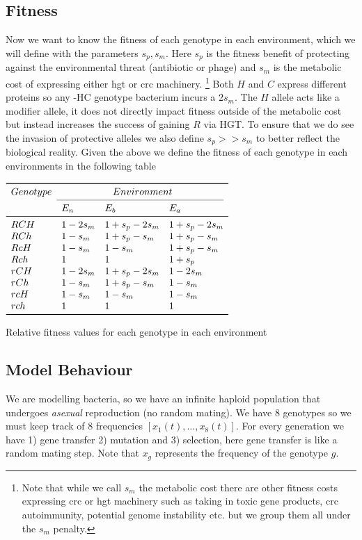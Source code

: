 \subsection{Fitness}
Now we want to know the fitness of each genotype in each environment, which we will define with the parameters $s_p,s_m$.
Here $s_p$ is the fitness benefit of protecting against the environmental threat (antibiotic or phage) and $s_m$ is the metabolic cost of expressing either \ac{hgt} or \ac{crc} machinery.
\footnote{Note that while we call $s_m$ the metabolic cost there are other fitness costs expressing \ac{crc} or \ac{hgt} machinery such as taking in toxic gene products, \ac{crc} autoimmunity, potential genome instability etc. but we group them all under the $s_m$ penalty.}
Both $H$ and $C$ express different proteins so any -HC genotype bacterium incurs a $2s_m$.
The $H$ allele acts like a modifier allele, it does not directly impact fitness outside of the metabolic cost but instead increases the success of gaining $R$ via HGT.
To ensure that we do see the invasion of protective alleles we also define $s_p >> s_m$ to better reflect the biological reality.
Given the above we define the fitness of each genotype in each environments in the following table
\begin{table}[H]
    \centering
    $\begin{array}{llll}
    \toprule
    Genotype & \multicolumn{3}{c}{Environment} \\
    \cmidrule(r){2-4}
        & E_n & E_b & E_a \\
    \midrule
    RCH & 1-2s_m & 1+s_p-2s_m & 1+s_p-2s_m \\
    RCh & 1- s_m & 1+s_p- s_m & 1+s_p- s_m \\
    RcH & 1- s_m & 1    - s_m & 1+s_p- s_m \\
    Rch & 1      & 1          & 1+s_p      \\
    rCH & 1-2s_m & 1+s_p-2s_m & 1    -2s_m \\
    rCh & 1 -s_m & 1+s_p- s_m & 1    - s_m \\
    rcH & 1- s_m & 1    - s_m & 1    - s_m \\
    rch & 1      & 1          & 1          \\
    \bottomrule
    \end{array}$
    \caption{Relative fitness values for each genotype in each environment}
    \label{ft}
\end{table}
\FloatBarrier

\subsection{Model Behaviour}
We are modelling bacteria, so we have an infinite haploid population that undergoes \emph{asexual} reproduction (no random mating).
We have 8 genotypes so we must keep track of 8 frequencies $[x_1(t),\dots,x_8(t)]$.
For every generation we have 1) gene transfer 2) mutation and 3) selection, here gene transfer is like a random mating step.
Note that $x_g$ represents the frequency of the genotype $g$.

